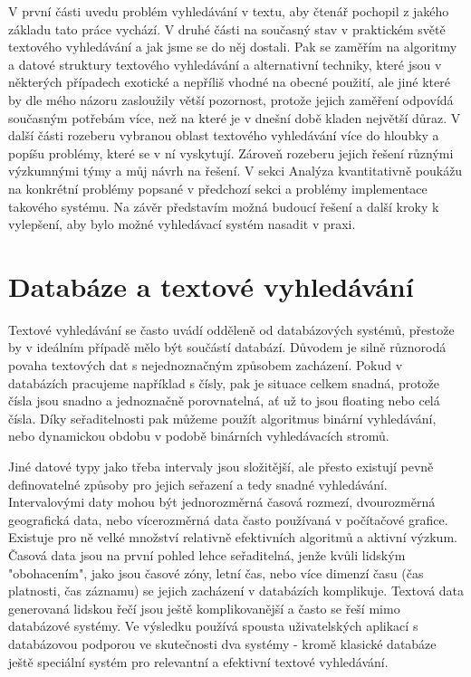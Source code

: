 \documentclass[11pt]{article}
\begin{document}
V první části uvedu problém vyhledávání v textu, aby čtenář pochopil z jakého
základu tato práce vychází. V druhé části na současný stav v praktickém světě
textového vyhledávání a jak jsme se do něj dostali. Pak se zaměřím na algoritmy
a datové struktury textového vyhledávání a alternativní techniky, které jsou v
některých případech exotické a nepříliš vhodné na obecné použití, ale jiné
které by dle mého názoru zasloužily větší pozornost, protože jejich zaměření
odpovídá současným potřebám více, než na které je v dnešní době kladen největší
důraz. V další části rozeberu vybranou oblast textového vyhledávání více do
hloubky a popíšu problémy, které se v ní vyskytují. Zároveň rozeberu jejich
řešení různými výzkumnými týmy a můj návrh na řešení. V sekci Analýza
kvantitativně poukážu na konkrétní problémy popsané v předchozí sekci a
problémy implementace takového systému. Na závěr představím možná budoucí
řešení a další kroky k vylepšení, aby bylo možné vyhledávací systém nasadit v
praxi.


\section{Databáze a textové vyhledávání}
Textové vyhledávání se často uvádí odděleně od databázových systémů, přestože
by v ideálním případě mělo být součástí databází. Důvodem je silně různorodá
povaha textových dat s nejednoznačným způsobem zacházení. Pokud v databázích
pracujeme například s čísly, pak je situace celkem snadná, protože čísla jsou
snadno a jednoznačně porovnatelná, ať už to jsou floating nebo celá čísla. Díky
seřaditelnosti pak můžeme použít algoritmus binární vyhledávání, nebo
dynamickou obdobu v podobě binárních vyhledávacích stromů.

Jiné datové typy jako třeba intervaly jsou složitější, ale přesto existují
pevně definovatelné způsoby pro jejich seřazení a tedy snadné vyhledávání.
Intervalovými daty mohou být jednorozměrná časová rozmezí, dvourozměrná
geografická data, nebo vícerozměrná data často používaná v počítačové grafice.
Existuje pro ně velké množství relativně efektivních algoritmů a aktivní
výzkum. Časová data jsou na první pohled lehce seřaditelná, jenže kvůli lidským
"obohacením", jako jsou časové zóny, letní čas, nebo více dimenzí času (čas
platnosti, čas záznamu) se jejich zacházení v databázích komplikuje. Textová
data generovaná lidskou řečí jsou ještě komplikovanější a často se řeší mimo
databázové systémy. Ve výsledku používá spousta uživatelských aplikací s
databázovou podporou ve skutečnosti dva systémy - kromě klasické databáze ještě
speciální systém pro relevantní a efektivní textové vyhledávání.
\end{document}
